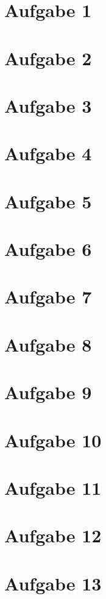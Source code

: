 \documentclass{article}
\begin{document}
  
\section*{Aufgabe 1}


\section*{Aufgabe 2}

  
\section*{Aufgabe 3}


\section*{Aufgabe 4}


\section*{Aufgabe 5}


\section*{Aufgabe 6}


\section*{Aufgabe 7}


\section*{Aufgabe 8}


\section*{Aufgabe 9}


\section*{Aufgabe 10}


\section*{Aufgabe 11}


\section*{Aufgabe 12}


\section*{Aufgabe 13}

  
\end{document}
